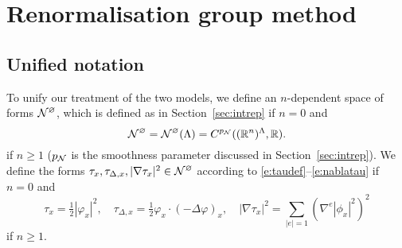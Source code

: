 \chapter{Renormalisation group method}





\section{Unified notation}

To unify our treatment of the two models, we define an $n$-dependent space of forms
$\mathcal{N}^\varnothing$, which is defined as in Section~\ref{sec:intrep} if $n = 0$ and
\begin{equation}
\label{e:Ncaldef}
\mathcal{N}^\varnothing
	= \mathcal{N}^\varnothing(\Lambda)
	= C^{p_{\mathcal{N}}}(({\mathbb R}^n)^\Lambda,{\mathbb R}).
\end{equation}
if $n \ge 1$ ($p_{\mathcal{N}}$ is the smoothness parameter discussed in Section~\ref{sec:intrep}).
We define the forms $\tau_x, \tau_{\Delta,x}, |\nabla\tau_x|^2 \in \mathcal{N}^\varnothing$ according
to \eqref{e:taudef}--\eqref{e:nablatau} if $n = 0$ and
\begin{equation}
\label{e:tauphi}
\tau_x = \tfrac{1}{2} |\varphi_x|^2,
	\quad
\tau_{\Delta,x} = \tfrac{1}{2} \varphi_x \cdot (-\Delta \varphi)_x,
	\quad
|\nabla\tau_x|^2 = \sum_{|e|=1} (\nabla^e |\phi_x|^2)^2
\end{equation}
if $n \ge 1$.

